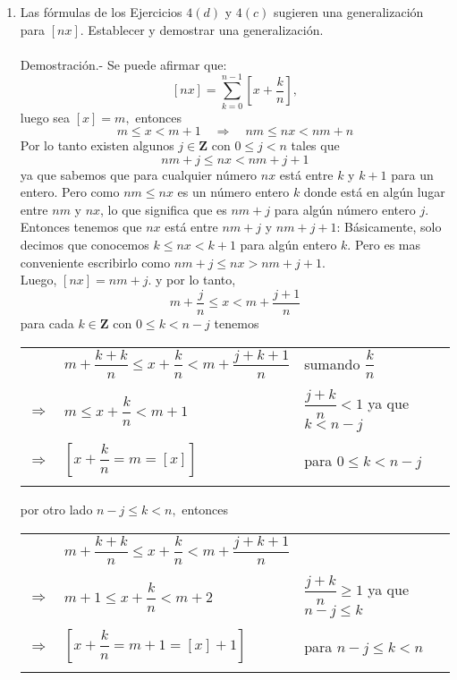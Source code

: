\begin{enumerate}
    \item  Las fórmulas de los Ejercicios $4(d)$ y $4(c)$ sugieren una generalización para $[nx]$. Establecer y demostrar una  generalización.\\\\
	Demostración.-\; Se puede afirmar que: $$[nx] =\sum\limits_{k=0}^{n-1} \left[ x + \dfrac{k}{n}\right],$$ luego sea $[x]=m,$ entonces $$m\leq x < m+1 \quad \Longrightarrow \quad nm \leq nx < nm+n$$ Por lo tanto existen algunos $j \in \mathbf{Z}$ con $0\leq j < n$ tales que $$nm+j\leq nx < nm + j + 1$$ ya que sabemos que para cualquier número $nx$ está entre $k$ y $k+1$ para un entero. Pero como $nm\leq nx$ es un número entero $k$ donde está en algún lugar entre $nm$ y $nx$, lo que significa que es $nm+j$ para algún número entero $j$. Entonces tenemos que $nx$ está entre $nm+j$ y $nm+j+1$: Básicamente, solo decimos que conocemos $k\leq nx<k+1$ para algún entero $k$. Pero es mas conveniente escribirlo como $nm+j\leq nx>nm+j+1$.\\
	Luego, $[nx]=nm+j$. y por lo tanto, $$m+\dfrac{j}{n}\leq x < m + \dfrac{j+1}{n}$$ 
	para cada $k\in \mathbf{Z}$ con $0\leq k <n-j$ tenemos
	\begin{center}
	    \begin{tabular}{cll}
		& $m+\dfrac{k+k}{n} \leq x + \dfrac{k}{n} < m + \dfrac{j+k+1}{n}$ & sumando $\dfrac{k}{n}$ \\\\
		 $\Longrightarrow$ & $m\leq x+\dfrac{k}{n}< m+1$ & $\dfrac{j+k}{n} <  1$ ya que $k<n-j$\\\\
		 $\Longrightarrow$ & $\left[x+\dfrac{k}{n}=m=[x]\right]$ & para $0\leq k < n-j$ \\\\
	    \end{tabular}
	\end{center}
	por otro lado $n-j\leq k < n,$ entonces
	\begin{center}
	    \begin{tabular}{cll}
		& $m+\dfrac{k+k}{n} \leq x + \dfrac{k}{n} < m + \dfrac{j+k+1}{n}$ & \\\\
		 $\Longrightarrow$ & $m+1\leq x+\dfrac{k}{n}< m+2$ & $\dfrac{j+k}{n} \geq  1$ ya que $n-j\leq k$\\\\
		 $\Longrightarrow$ & $\left[x+\dfrac{k}{n}=m+1=[x]+1\right]$ & para $n-j \leq k < n$ \\\\

\end{tabular}
\end{center}
\end{enumerate}
